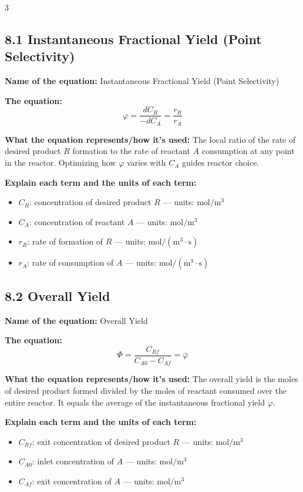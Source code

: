 \documentclass[8pt]{extarticle}
\begin{document}
\begin{multicols*}{3}
\subsection*{8.1 Instantaneous Fractional Yield (Point Selectivity)}

\textbf{Name of the equation:} Instantaneous Fractional Yield (Point Selectivity)

\textbf{The equation:}
\[
\varphi=\frac{dC_R}{-dC_A}=\frac{r_R}{r_A}
\]

\textbf{What the equation represents/how it's used:} The local ratio of the rate of desired product \(R\) formation to the rate of reactant \(A\) consumption at any point in the reactor. Optimizing how \(\varphi\) varies with \(C_A\) guides reactor choice.

\textbf{Explain each term and the units of each term:}
\begin{itemize}
\item \(C_R\): concentration of desired product \(R\) --- units: \(\mathrm{mol/m^3}\)
\item \(C_A\): concentration of reactant \(A\) --- units: \(\mathrm{mol/m^3}\)
\item \(r_R\): rate of formation of \(R\) --- units: \(\mathrm{mol/(m^3\cdot s)}\)
\item \(r_A\): rate of consumption of \(A\) --- units: \(\mathrm{mol/(m^3\cdot s)}\)
\end{itemize}

\subsection*{8.2 Overall Yield}

\textbf{Name of the equation:} Overall Yield

\textbf{The equation:}
\[
\Phi=\frac{C_{Rf}}{C_{A0}-C_{Af}}=\bar{\varphi}
\]

\textbf{What the equation represents/how it's used:} The overall yield is the moles of desired product formed divided by the moles of reactant consumed over the entire reactor. It equals the average of the instantaneous fractional yield \(\varphi\).

\textbf{Explain each term and the units of each term:}
\begin{itemize}
\item \(C_{Rf}\): exit concentration of desired product \(R\) --- units: \(\mathrm{mol/m^3}\)
\item \(C_{A0}\): inlet concentration of \(A\) --- units: \(\mathrm{mol/m^3}\)
\item \(C_{Af}\): exit concentration of \(A\) --- units: \(\mathrm{mol/m^3}\)
\end{itemize}


\end{multicols*}
\end{document}
